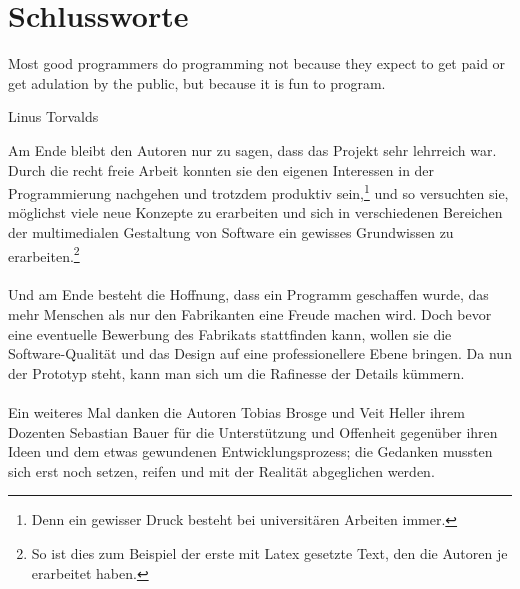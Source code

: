 \newpage

\section{Schlussworte} \label{sec:Schluss}
	\epigraph{Most good programmers do programming not because they expect to get paid or get adulation by the public, but because it is fun to program.}{Linus Torvalds}
    Am Ende bleibt den Autoren nur zu sagen, dass das Projekt sehr lehrreich war. Durch die recht freie Arbeit konnten sie den eigenen Interessen in der Programmierung
    nachgehen und trotzdem produktiv sein,\footnote{Denn ein gewisser Druck besteht bei universitären Arbeiten immer.} und so versuchten sie, möglichst viele neue Konzepte
    zu erarbeiten und sich in verschiedenen Bereichen der multimedialen Gestaltung von Software ein gewisses Grundwissen zu erarbeiten.\footnote{So ist dies zum Beispiel
    der erste mit Latex gesetzte Text, den die Autoren je erarbeitet haben.}
\paragraph{}
    Und am Ende besteht die Hoffnung, dass ein Programm geschaffen wurde, das mehr Menschen als nur den Fabrikanten eine Freude machen wird. Doch bevor eine eventuelle
    Bewerbung des Fabrikats stattfinden kann, wollen sie die Software-Qualität und das Design auf eine professionellere Ebene bringen. Da nun der Prototyp steht, kann man sich
    um die Rafinesse der Details kümmern.
\paragraph{}
    Ein weiteres Mal danken die Autoren Tobias Brosge und Veit Heller ihrem Dozenten Sebastian Bauer für die Unterstützung und Offenheit gegenüber ihren Ideen und dem etwas
    gewundenen Entwicklungsprozess; die Gedanken mussten sich erst noch setzen, reifen und mit der Realität abgeglichen werden.

\newpage
